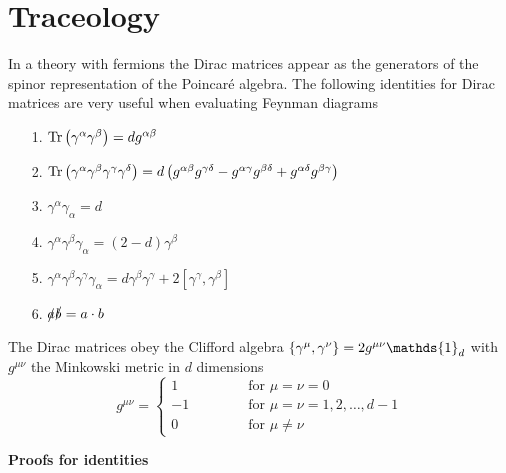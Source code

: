 \section{Traceology}
\label{app:Traceology}
In a theory with fermions the Dirac matrices appear as the generators of the spinor representation of the Poincaré algebra. The following identities for Dirac matrices are very useful when evaluating Feynman diagrams
\begin{itemize}
\item[1.] $\mathrm{Tr} \left( \gamma^{\alpha} \gamma^{\beta} \right) = dg^{\alpha\beta}$ \numberitem\label{eqn:Tr2g}

\item[2.] $\mathrm{Tr} \left( \gamma^{\alpha}\gamma^{\beta}\gamma^{\gamma}\gamma^{\delta} \right) = d \left( g^{\alpha\beta}g^{\gamma\delta} - g^{\alpha\gamma}g^{\beta\delta} + g^{\alpha\delta}g^{\beta\gamma} \right)$ \numberitem\label{eqn:Tr4g}

\item[3.] $\gamma^{\alpha}\gamma_{\alpha} = d$ \numberitem\label{eqn:2g}

\item[4.] $\gamma^{\alpha}\gamma^{\beta}\gamma_{\alpha} = \left( 2-d \right) \gamma^{\beta}$ \numberitem\label{eqn:3g}

\item[5.] $\gamma^{\alpha}\gamma^{\beta}\gamma^{\gamma}\gamma_{\alpha} = d\gamma^{\beta}\gamma^{\gamma} + 2 \left[ \gamma^{\gamma}, \gamma^{\beta} \right]$ \numberitem\label{eqn:4g}

\item[6.] $\slashed{a}\slashed{b} = a \cdot b$ \numberitem\label{eqn:fsldot}

\end{itemize}
The Dirac matrices obey the Clifford algebra $\lbr \gamma^{\mu}, \gamma^{\nu} \rbr = 2 g^{\mu\nu} \mathds{1}_d$ with $g^{\mu\nu}$ the Minkowski metric in $d$ dimensions
\begin{equation*}
 g^{\mu\nu} = 
\begin{cases}
1 \quad\qquad\qquad \text{for } \mu = \nu = 0 \\
-1 \ \qquad\qquad \text{for } \mu = \nu = 1,2,\ldots,d-1 \\
0 \quad\qquad\qquad \text{for } \mu \neq \nu
\end{cases}
\end{equation*}



{\bf Proofs for identities}

